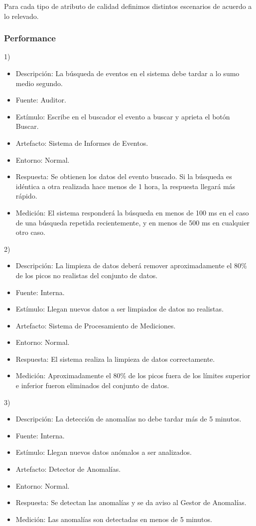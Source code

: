 \documentclass{article}
\theoremstyle{definition}
\theoremstyle{remark}
\begin{document}
Para cada tipo de atributo de calidad definimos distintos escenarios de acuerdo a lo relevado.

\subsubsection{Performance}

1)
\begin{itemize}
  \item Descripción: La búsqueda de eventos en el sistema debe tardar a lo sumo medio segundo.
  \item Fuente: Auditor.
  \item Estímulo: Escribe en el buscador el evento a buscar y aprieta el botón Buscar.
  \item Artefacto: Sistema de Informes de Eventos.
  \item Entorno: Normal.
  \item Respuesta: Se obtienen los datos del evento buscado. Si la búsqueda es idéntica a otra realizada hace menos de 1 hora, la respuesta llegará más rápido.
  \item Medición: El sistema responderá la búsqueda en menos de 100 ms en el caso de una búsqueda repetida recientemente, y en menos de 500 ms en cualquier otro caso.
\end{itemize}

2)
\begin{itemize}
  \item Descripción: La limpieza de datos deberá remover aproximadamente el 80\% de los picos no realistas del conjunto de datos.
  \item Fuente: Interna. %
  \item Estímulo: Llegan nuevos datos a ser limpiados de datos no realistas. %
  \item Artefacto: Sistema de Procesamiento de Mediciones. %
  \item Entorno: Normal.
  \item Respuesta: El sistema realiza la limpieza de datos correctamente.
  \item Medición: Aproximadamente el 80\% de los picos fuera de los límites superior e inferior fueron eliminados del conjunto de datos.
\end{itemize}

3)
\begin{itemize}
  \item Descripción: La detección de anomalías no debe tardar más de 5 minutos.
  \item Fuente: Interna.
  \item Estímulo: Llegan nuevos datos anómalos a ser analizados.
  \item Artefacto: Detector de Anomalías.
  \item Entorno: Normal.
  \item Respuesta: Se detectan las anomalías y se da aviso al Gestor de Anomalías.
  \item Medición: Las anomalías son detectadas en menos de 5 minutos.
\end{itemize}
\end{document}
